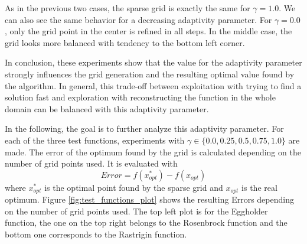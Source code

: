 As in the previous two cases, the sparse grid is exactly the same for $ \gamma = 1.0 $. We can also see the same behavior for a decreasing adaptivity parameter. For $ \gamma = 0.0 $, only the grid point in the center is refined in all steps. In the middle case, the grid looks more balanced with tendency to the bottom left corner.  \newline 


In conclusion, these experiments show that the value for the adaptivity parameter strongly influences the grid generation and the resulting optimal value found by the algorithm. In general, this trade-off between exploitation with trying to find a solution fast and exploration with reconstructing the function in the whole domain can be balanced with this adaptivity parameter. \newline

In the following, the goal is to further analyze this adaptivity parameter. For each of the three test functions, experiments with $ \gamma \in \{0.0, 0.25, 0.5, 0.75, 1.0\} $ are made. The error of the optimum found by the grid is calculated depending on the number of grid points used. It is evaluated with 
\begin{equation}
 Error = f(x_{opt}^*) - f(x_{opt}) 
\end{equation}
where $ x_{opt}^* $ is the optimal point found by the sparse grid and $ x_{opt} $ is the real optimum. Figure \ref{fig:test_functions_plot} shows the resulting Errors depending on the number of grid points used. The top left plot is for the Eggholder function, the one on the top right belongs to the Rosenbrock function and the bottom one corresponds to the Rastrigin function. \newline

